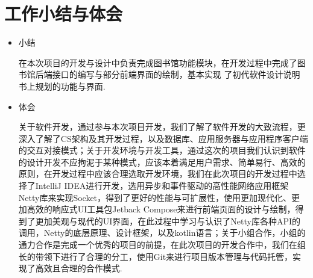 \documentclass{article}
\begin{document}
\section{工作小结与体会}
\begin{itemize}
    \item 小结

          在本次项目的开发与设计中负责完成图书馆功能模块，在开发过程中完成了图书馆后端接口的编写与部分前端界面的绘制，基本实现 了初代软件设计说明书上规划的功能与界面.

    \item 体会

          关于软件开发，通过参与本次项目开发，我们了解了软件开发的大致流程，更深入了解了CS架构及其开发过程，以及数据库、应用服务器与应用程序客户端的交互对接模式；关于开发环境与开发工具，通过这次的项目我们认识到软件的设计开发不应拘泥于某种模式，应该本着满足用户需求、简单易行、高效的原则，在开发过程中应该合理选取开发环境，我们在此次项目的开发过程中选择了IntelliJ IDEA进行开发，选用异步和事件驱动的高性能网络应用框架Netty库来实现Socket，得到了更好的性能与可扩展性，使用更加现代化、更加高效的响应式UI工具包Jetback Compose来进行前端页面的设计与绘制，得到了更加美观与现代的UI界面，在此过程中学习与认识了Netty库各种API的调用，Netty的底层原理、设计框架，以及kotlin语言；关于小组合作，小组的通力合作是完成一个优秀的项目的前提，在此次项目的开发合作中，我们在组长的带领下进行了合理的分工，使用Git来进行项目版本管理与代码托管，实现了高效且合理的合作模式.

\end{itemize}
\end{document}
